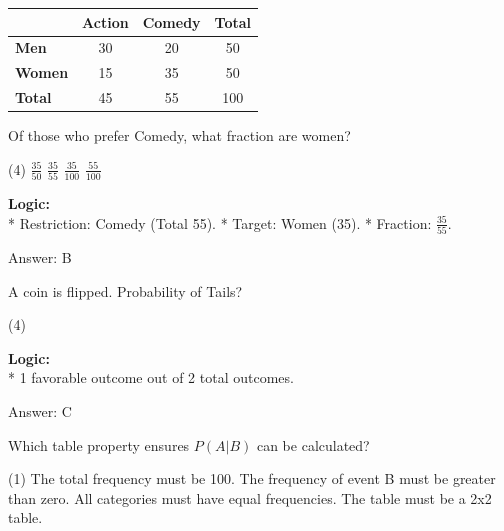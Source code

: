 \documentclass[11pt,paper=a4,answers]{exam}
\begin{document}
\begin{questions}
\question
\begin{center}
\begin{tabular}{|l|c|c|c|}
\hline
 & \textbf{Action} & \textbf{Comedy} & \textbf{Total} \\ \hline
\textbf{Men} & 30 & 20 & 50 \\ \hline
\textbf{Women} & 15 & 35 & 50 \\ \hline
\textbf{Total} & 45 & 55 & 100 \\ \hline
\end{tabular}
\end{center}
Of those who prefer Comedy, what fraction are women?
\begin{tasks}(4)
    \task $\frac{35}{50}$
    \task $\frac{35}{55}$
    \task $\frac{35}{100}$
    \task $\frac{55}{100}$
\end{tasks}

\begin{solution}
\textbf{Logic:} \\
* Restriction: Comedy (Total 55).
* Target: Women (35).
* Fraction: $\frac{35}{55}$.

\vspace{30pt}

Answer: \colorbox{yellow!100}{B}
\end{solution}

\vspace{60pt}

\question
A coin is flipped. Probability of Tails?
\begin{tasks}(4)
\end{tasks}

\begin{solution}
\textbf{Logic:} \\
* 1 favorable outcome out of 2 total outcomes.

\vspace{30pt}

Answer: \colorbox{yellow!100}{C}
\end{solution}

\vspace{60pt}

\question
Which table property ensures $P(A|B)$ can be calculated?
\begin{tasks}(1)
    \task The total frequency must be 100.
    \task The frequency of event B must be greater than zero.
    \task All categories must have equal frequencies.
    \task The table must be a 2x2 table.
\end{tasks}


\end{questions}
\end{document}
